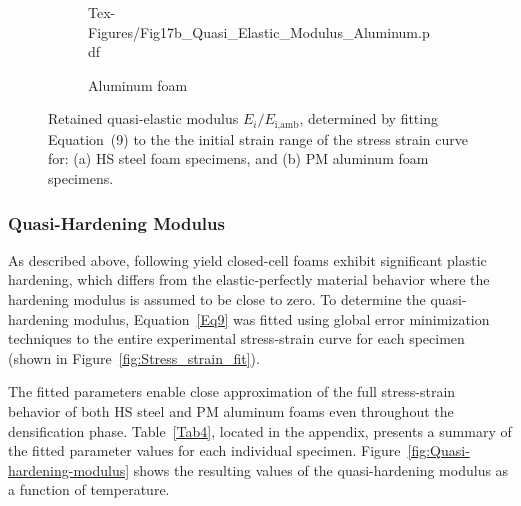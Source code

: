 \documentclass[review]{elsarticle}
\begin{document}
\begin{figure}
\begin{subfigure}{0.50\textwidth}
		{Tex-Figures/Fig17b_Quasi_Elastic_Modulus_Aluminum.pdf}
		\caption{Aluminum foam}
		\label{fig:Quasi-elast-modulus_Al}
	\end{subfigure}
	\caption{Retained quasi-elastic modulus $E_i/E_\text{i,amb}$, determined by fitting Equation~(9) to the the initial strain range of the stress strain curve for: (a) HS steel foam specimens, and (b) PM aluminum foam specimens.}
	\label{fig:Quasi-elast-modulus}
\end{figure}

\subsubsection{Quasi-Hardening Modulus}

As described above, following yield closed-cell foams exhibit significant plastic hardening, which differs from the elastic-perfectly material behavior where the hardening modulus is assumed to be close to zero. To determine the quasi-hardening modulus, Equation~\ref{Eq9} was fitted using global error minimization techniques to the entire experimental stress-strain curve for each specimen (shown in Figure~\ref{fig:Stress_strain_fit}).

The fitted parameters enable close approximation of the full stress-strain behavior of both HS steel and PM aluminum foams even throughout the densification phase. Table~\ref{Tab4}, located in the appendix, presents a summary of the fitted parameter values for each individual specimen. Figure~\ref{fig:Quasi-hardening-modulus} shows the resulting values of the quasi-hardening modulus as a function of temperature.
\end{document}
